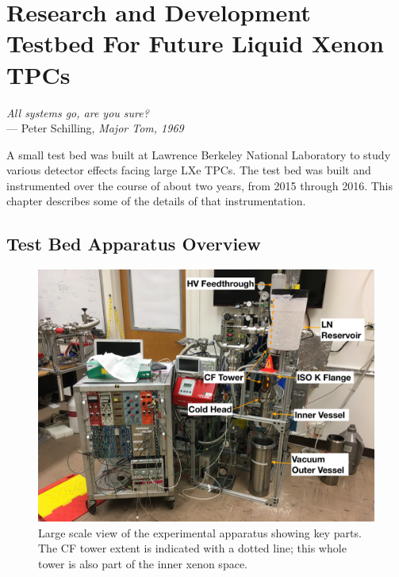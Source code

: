 \chapter{Research and Development Testbed For Future Liquid Xenon TPCs}

\label{ch:testbed} %

\begin{flushright}{\slshape    
  All systems go, are you sure? } \\ \medskip
    --- {Peter Schilling, \textit{Major Tom, 1969}}
\end{flushright}


A small test bed was built at Lawrence Berkeley National Laboratory to study various detector effects facing large \ac{LXe} \ac{TPC}s. The test bed was built and instrumented over the course of about two years, from 2015 through 2016. This chapter describes some of the details of that instrumentation.

\section{Test Bed Apparatus Overview}

\begin{figure}[htbp]
\begin{center}
\includegraphics[width=\textwidth]{figures/testbed/apparatus.jpg}
\caption{Large scale view of the experimental apparatus showing key parts. The \acs{CF} tower extent is indicated with a dotted line; this whole tower is also part of the inner xenon space.}
\label{fig:apparatus}
\end{center}
\end{figure}

